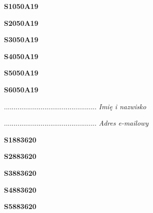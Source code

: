 \begin{turn}{90}\huge \textbf{S1050A19}\end{turn}

\begin{turn}{90}\huge \textbf{S2050A19}\end{turn}

\begin{turn}{90}\huge \textbf{S3050A19}\end{turn}

\begin{turn}{90}\huge \textbf{S4050A19}\end{turn}

\begin{turn}{90}\huge \textbf{S5050A19}\end{turn}

\begin{turn}{90}\huge \textbf{S6050A19}\end{turn}

\begin{turn}{90}\begin{minipage}{\linewidth} \vspace{20mm} ................................................  \textit{Imię i nazwisko}\end{minipage}\end{turn}

\begin{turn}{90}\begin{minipage}{\linewidth} \vspace{20mm} ................................................  \textit{Adres e-mailowy}\end{minipage}\end{turn}

\begin{turn}{90}\huge \textbf{S1883620}\end{turn}

\begin{turn}{90}\huge \textbf{S2883620}\end{turn}

\begin{turn}{90}\huge \textbf{S3883620}\end{turn}

\begin{turn}{90}\huge \textbf{S4883620}\end{turn}

\begin{turn}{90}\huge \textbf{S5883620}\end{turn}

